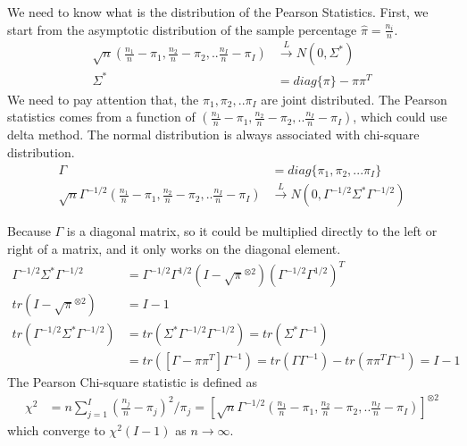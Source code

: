 	We need to know what is the distribution of the Pearson Statistics. First, we start from the asymptotic distribution of the sample percentage $\hat{\pi} = \frac{n_i}{n}$.
	\begin{align*}
		\sqrt{n} (\frac{n_1}{n} - \pi_1, \frac{n_2}{n} - \pi_2, ..\frac{n_I}{n}-\pi_I) & \xrightarrow{L} N(0, \Sigma^{\ast})\\
		\Sigma^{\ast} &= diag\{ \pi\} - \pi \pi^T
	\end{align*}
We need to pay attention that, the $\pi_1, \pi_2, .. \pi_I$ are joint distributed. The Pearson statistics comes from a function of $(\frac{n_1}{n} - \pi_1, \frac{n_2}{n} - \pi_2, ..\frac{n_I}{n}-\pi_I)$, which could use delta method. The normal distribution is always associated with chi-square distribution. \\
	\begin{align*}
		\Gamma &= diag\{ \pi_1, \pi_2,... \pi_I \} \\
		\sqrt{n} \Gamma^{-1/2} \left(\frac{n_1}{n} - \pi_1, \frac{n_2}{n} - \pi_2, ..\frac{n_I}{n}-\pi_I \right) & \xrightarrow{L} N(0, \Gamma^{-1/2} \Sigma^{\ast} \Gamma^{-1/2})
	\end{align*}
	
	Because $\Gamma$ is a diagonal matrix, so it could be multiplied directly to the left or right of a matrix, and it only works on the diagonal element. \\
	\begin{align*}
		\Gamma^{-1/2} \Sigma^{\ast} \Gamma^{-1/2} &= \Gamma^{-1/2} \Gamma^{1/2} (I - \sqrt{\pi}^{\otimes 2}) \left( \Gamma^{-1/2} \Gamma^{1/2} \right)^T\\
		tr(I - \sqrt{\pi}^{\otimes 2}) & = I-1 \\
		tr(\Gamma^{-1/2} \Sigma^{\ast} \Gamma^{-1/2}) &= tr( \Sigma^{\ast} \Gamma^{-1/2} \Gamma^{-1/2}) = tr( \Sigma^{\ast} \Gamma^{-1}) \\
		&= tr( [\Gamma - \pi \pi^T] \Gamma^{-1}) = tr(\Gamma\Gamma^{-1}) - tr(\pi \pi^T \Gamma^{-1}) = I-1
	\end{align*}
	The Pearson Chi-square statistic is defined as
	\begin{align*}
		\chi^2 &= n \sum_{j=1}^I (\frac{n_j}{n} - \pi_j)^2/\pi_j = \left[ \sqrt{n} \Gamma^{-1/2} \left(\frac{n_1}{n} - \pi_1, \frac{n_2}{n} - \pi_2, ..\frac{n_I}{n}-\pi_I \right) \right]^{\otimes 2}
	\end{align*}
	which converge to $\chi^2(I-1)$ as $n \rightarrow \infty$.

